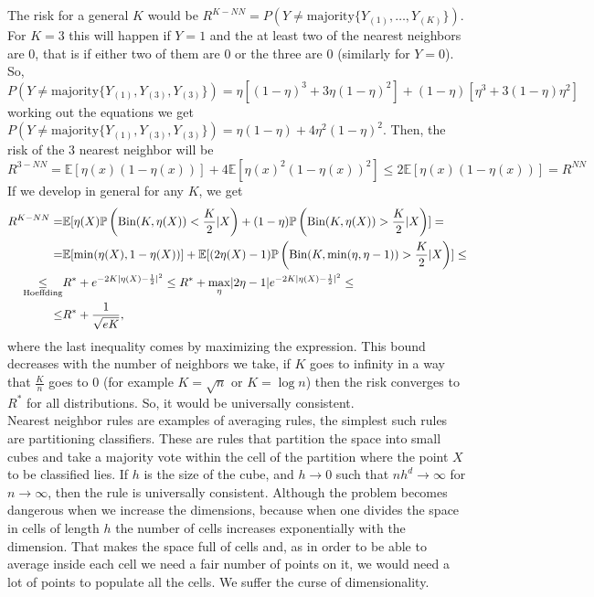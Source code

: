 \documentclass[11pt, english]{article}
\begin{document}
The risk for a general $K$ would be $R^{K-NN}=P(Y\neq \text{majority}\{Y_{(1)},\dots,Y_{(K)}\})$. For $K=3$ this will happen if $Y=1$ and the at least two of the nearest neighbors are 0, that is if either two of them are 0 or the three are 0 (similarly for $Y=0$). So, $P(Y\neq \text{majority}\{Y_{(1)},Y_{(3)},Y_{(3)}\})=\eta[(1-\eta)^3+3\eta(1-\eta)^2]+(1-\eta)[\eta^3+3(1-\eta)\eta^2]$ working out the equations we get $P(Y\neq \text{majority}\{Y_{(1)},Y_{(3)},Y_{(3)}\})=\eta(1-\eta)+4\eta^2(1-\eta)^2$. Then, the risk of the 3 nearest neighbor will be
\begin{equation}
	R^{3-NN}=\mathbb{E}[\eta(x) (1-\eta(x))]+4\mathbb{E}[\eta(x)^2(1-\eta(x))^2]\leq2\mathbb{E}[\eta(x)(1-\eta(x))]=R^{NN}
\end{equation}
If we develop in general for any $K$, we get
\begin{align}
	R^{K-NN} = &\mathbb{E}[\eta(X)\mathbb{P}\left(\text{Bin}(K,\eta(X))<\frac{K}{2}|X\right)+(1-\eta)\mathbb{P}\left(\text{Bin}(K,\eta(X))>\frac{K}{2}|X\right)]=\\
	= & \mathbb{E}[\min(\eta(X),1-\eta(X))]+\mathbb{E}[(2\eta(X)-1)\mathbb{P}\left(\text{Bin}(K,\min(\eta,\eta-1))>\frac{K}{2}|X\right)]\leq\\
	\underset{\scriptsize{\text{Hoeffding}}}{\leq} & R^*+e^{-2K|\eta(X)-\frac{1}{2}|^2}\leq R^*+\underset{\eta}{\max}|2\eta-1|e^{-2K|\eta(X)-\frac{1}{2}|^2}\leq\\
	\leq & R^*+\frac{1}{\sqrt{eK}},
\end{align}
where the last inequality comes by maximizing the expression. This bound decreases with the number of neighbors we take, if $K$ goes to infinity in a way that $\frac{K}{n}$ goes to 0 (for example $K=\sqrt{n}$ or $K=\log n$) then the risk converges to $R^*$ for all distributions. So, it would be universally consistent. \\

Nearest neighbor rules are examples of averaging rules, the simplest such rules are partitioning classifiers. These are rules that partition the space into small cubes and take a majority vote within the cell of the partition where the point $X$ to be classified lies. If $h$ is the size of the cube, and $h\rightarrow 0$ such that $nh^d\rightarrow \infty$ for $n\rightarrow\infty$, then the rule is universally consistent. 
Although the problem becomes dangerous when we increase the dimensions, because when one divides the space in cells of length $h$ the number of cells increases exponentially with the dimension. That makes the space full of cells and, as in order to be able to average inside each cell we need a fair number of points on it, we would need a lot of points to populate all the cells. We suffer the curse of dimensionality.\\
\end{document}
